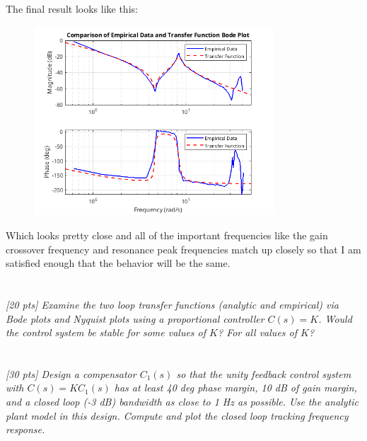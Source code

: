 \documentclass{article}
\begin{document}
The final result looks like this:

\begin{figure}[H]
    \centering
    \includegraphics[width=0.8\textwidth]{analyticTFbode.png}
    \label{fig:analyticTFbode}
\end{figure}

Which looks pretty close and all of the important frequencies like the gain crossover frequency and resonance peak frequencies match up closely so that I am satisfied enough that the behavior will be the same.

\section{}

\textit{[20 pts] Examine the two loop transfer functions (analytic and empirical) via Bode plots and Nyquist plots using a proportional controller \(C(s) = K\). Would the control system be stable for some values of \(K\)? For all values of \(K\)?}

\section{}

\textit{[30 pts] Design a compensator \(C_1(s)\) so that the unity feedback control system with \(C(s) = K C_1(s)\) has at least 40 deg phase margin, 10 dB of gain margin, and a closed loop (-3 dB) bandwidth as close to 1 Hz as possible. Use the analytic plant model in this design. Compute and plot the closed loop tracking frequency response.}

\section{}
\end{document}
